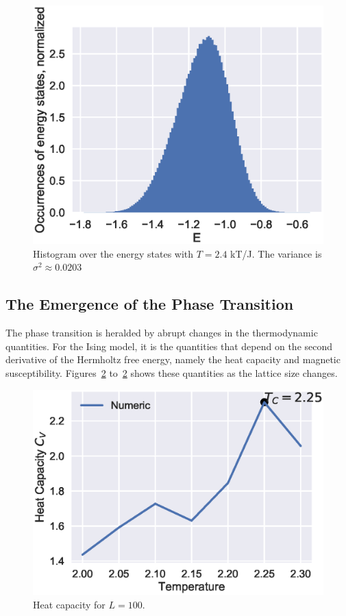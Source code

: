 \documentclass[aps,reprint]{revtex4-1}
\begin{document}
\begin{figure}[H]
  \centering
  \includegraphics[width=\columnwidth]{figures/4db.eps}
  \caption{\label{fig:4db} Histogram over the energy states with \(T=2.4\) kT/J.
  The variance is \(\sigma^{2} \approx 0.0203\)}
\end{figure}

\subsection{The Emergence of the Phase Transition}
\label{sec:appe-phase-trans}

The phase transition is heralded by abrupt changes in the thermodynamic
quantities. For the Ising model, it is the quantities that depend on the second
derivative of the Hermholtz free energy, namely the heat capacity and magnetic
susceptibility. Figures~\ref{fig:100CVTc} to~\ref{fig:100CVTc} shows these
quantities as the lattice size changes.

\begin{figure}[H]
  \centering
  \includegraphics[width=\columnwidth]{figures/L100Cv.eps}
  \caption{\label{fig:100CVTc} Heat capacity for \(L=100\).}
\end{figure}
\end{document}
